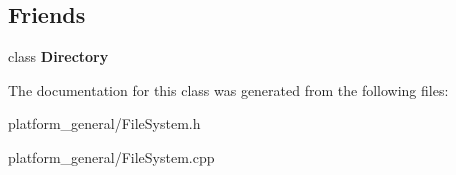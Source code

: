 \subsection*{\-Friends}
\begin{DoxyCompactItemize}
\item 
\hypertarget{classgeneral__server_1_1DatabaseStatusFile_a245303e8660be5fb8eb2828a8c44b773}{class {\bfseries \-Directory}}\label{classgeneral__server_1_1DatabaseStatusFile_a245303e8660be5fb8eb2828a8c44b773}

\end{DoxyCompactItemize}


\-The documentation for this class was generated from the following files\-:\begin{DoxyCompactItemize}
\item 
platform\-\_\-general/\-File\-System.\-h\item 
platform\-\_\-general/\-File\-System.\-cpp\end{DoxyCompactItemize}
